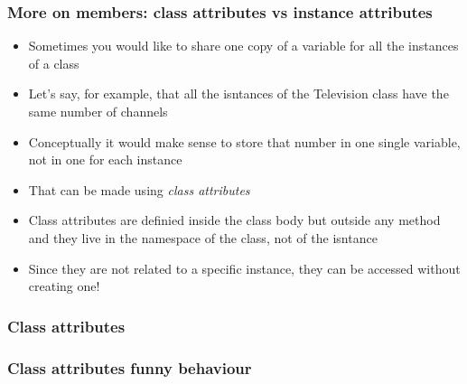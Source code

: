 \documentclass[9pt]{beamer}
\begin{document}
\begin{frame}
  \frametitle{More on members: class attributes vs instance attributes}
  
  \begin{itemize}
    \small
    \item Sometimes you would like to share one copy of a variable for all the instances of a class
    \smallskip
    \item Let's say, for example, that all the isntances of the Television class have the same number of channels
    \smallskip
    \item Conceptually it would make sense to store that number in one single variable, not in one for each instance
    \smallskip
    \item That can be made using \emph{class attributes}
    \smallskip
    \item Class attributes are definied inside the class body but outside any method and they live
          in the namespace of the class, not of the isntance
    \smallskip
    \item Since they are not related to a specific instance, they can be accessed without creating one!
  \end{itemize}

\end{frame}


\begin{frame}
  \frametitle{Class attributes}
  
\end{frame}


\begin{frame}
  \frametitle{Class attributes funny behaviour}
  
\end{frame}
\end{document}
